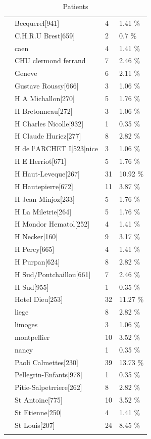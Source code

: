 \documentclass[a4paper,11pt] {article}
\begin{document}
\begin{longtable}{llll}
   & Becquerel[941] & 4 & 1.41 \% \\ 
   & C.H.R.U Brest[659] & 2 & 0.7 \% \\ 
   & caen & 4 & 1.41 \% \\ 
   & CHU clermond ferrand & 7 & 2.46 \% \\ 
   & Geneve & 6 & 2.11 \% \\ 
   & Gustave Roussy[666] & 3 & 1.06 \% \\ 
   & H A Michallon[270] & 5 & 1.76 \% \\ 
   & H Bretonneau[272] & 3 & 1.06 \% \\ 
   & H Charles Nicolle[932] & 1 & 0.35 \% \\ 
   & H Claude Huriez[277] & 8 & 2.82 \% \\ 
   & H de l`ARCHET I[523]nice & 3 & 1.06 \% \\ 
   & H E Herriot[671] & 5 & 1.76 \% \\ 
   & H Haut-Leveque[267] & 31 & 10.92 \% \\ 
   & H Hautepierre[672] & 11 & 3.87 \% \\ 
   & H Jean Minjoz[233] & 5 & 1.76 \% \\ 
   & H La Miletrie[264] & 5 & 1.76 \% \\ 
   & H Mondor Hematol[252] & 4 & 1.41 \% \\ 
   & H Necker[160] & 9 & 3.17 \% \\ 
   & H Percy[665] & 4 & 1.41 \% \\ 
   & H Purpan[624] & 8 & 2.82 \% \\ 
   & H Sud/Pontchaillou[661] & 7 & 2.46 \% \\ 
   & H Sud[955] & 1 & 0.35 \% \\ 
   & Hotel Dieu[253] & 32 & 11.27 \% \\ 
   & liege & 8 & 2.82 \% \\ 
   & limoges & 3 & 1.06 \% \\ 
   & montpellier & 10 & 3.52 \% \\ 
   & nancy & 1 & 0.35 \% \\ 
   & Paoli Calmettes[230] & 39 & 13.73 \% \\ 
   & Pellegrin-Enfants[978] & 1 & 0.35 \% \\ 
   & Pitie-Salpetrriere[262] & 8 & 2.82 \% \\ 
   & St Antoine[775] & 10 & 3.52 \% \\ 
   & St Etienne[250] & 4 & 1.41 \% \\ 
   & St Louis[207] & 24 & 8.45 \% \\ 
   \hline
\hline
\caption{Patients} 
\label{tab:condi}
\end{longtable}
\end{document}
